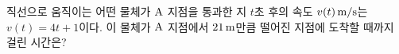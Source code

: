 직선으로 움직이는 어떤 물체가 $\mathrm{A}$ 지점을 통과한 지 $t$초 후의 속도 $v(t)\mkern3mu \mathrm{m/s}$는 $v(t)=4t+1$이다. 이 물체가 $\mathrm{A}$ 지점에서 $21\mkern3mu \mathrm{m}$만큼 떨어진 지점에 도착할 때까지 걸린 시간은?
